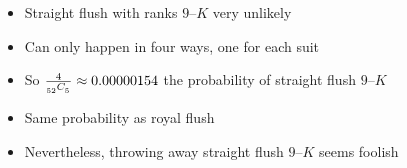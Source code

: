 \documentclass[handout,xcolor=dvipsnames]{beamer}
\theoremstyle{definition}
\newcommand\ncr[2]{\tensor[_{#1}]C{_{#2}}}
\begin{document}
\begin{frame}
\begin{itemize}
\item Straight flush with ranks $9$--$K$ very unlikely
\item Can only happen in four ways, one for each suit
\item So $\frac{4}{\ncr{52}{5}}\approx 0.00000154$ the probability
of straight flush $9$--$K$
\item Same probability as royal flush
\item Nevertheless, throwing away straight flush $9$--$K$ seems foolish
\end{itemize}
\end{frame}
\end{document}

